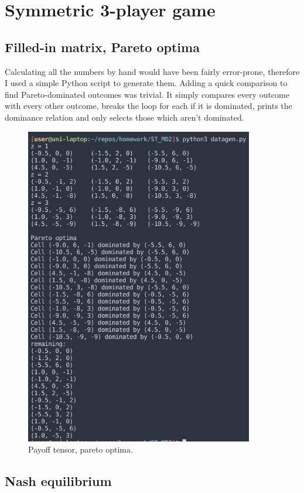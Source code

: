 \documentclass[12pt, a4paper]{article}
\begin{document}
\newpage
\section{Symmetric 3-player game}

\subsection{Filled-in matrix, Pareto optima}

Calculating all the numbers by hand would have been fairly error-prone, therefore I used a simple Python script to generate them. Adding a quick comparison to find Pareto-dominated outcomes was trivial. It simply compares every outcome with every other outcome, breaks the loop for each if it is dominated, prints the dominance relation and only selects those which aren't dominated.

\begin{figure}[h!]
    \centering
    \includegraphics[height=14cm]{output.png}
    \caption{Payoff tensor, pareto optima.}
\end{figure}

\newpage
\subsection{Nash equilibrium}
\end{document}
